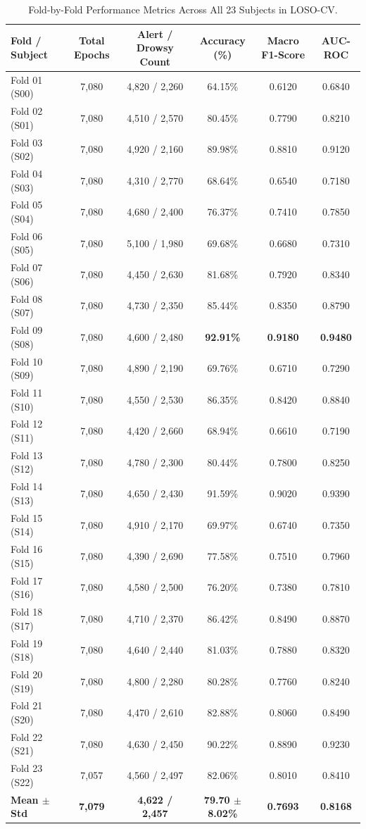 \documentclass[conference]{IEEEtran}
\begin{document}
\begin{table}[t]
\caption{Fold-by-Fold Performance Metrics Across All 23 Subjects in LOSO-CV.}
\label{tab:subject_breakdown}
\centering
\footnotesize
\setlength{\tabcolsep}{7pt}
\begin{tabular}{@{}lccccc@{}}
\toprule
\textbf{Fold / Subject} & \textbf{Total Epochs} & \textbf{Alert / Drowsy Count} & \textbf{Accuracy (\%)} & \textbf{Macro F1-Score} & \textbf{AUC-ROC} \\
\midrule
Fold 01 (S00) & 7,080 & 4,820 / 2,260 & 64.15\% & 0.6120 & 0.6840 \\
Fold 02 (S01) & 7,080 & 4,510 / 2,570 & 80.45\% & 0.7790 & 0.8210 \\
Fold 03 (S02) & 7,080 & 4,920 / 2,160 & 89.98\% & 0.8810 & 0.9120 \\
Fold 04 (S03) & 7,080 & 4,310 / 2,770 & 68.64\% & 0.6540 & 0.7180 \\
Fold 05 (S04) & 7,080 & 4,680 / 2,400 & 76.37\% & 0.7410 & 0.7850 \\
Fold 06 (S05) & 7,080 & 5,100 / 1,980 & 69.68\% & 0.6680 & 0.7310 \\
Fold 07 (S06) & 7,080 & 4,450 / 2,630 & 81.68\% & 0.7920 & 0.8340 \\
Fold 08 (S07) & 7,080 & 4,730 / 2,350 & 85.44\% & 0.8350 & 0.8790 \\
Fold 09 (S08) & 7,080 & 4,600 / 2,480 & \textbf{92.91\%} & \textbf{0.9180} & \textbf{0.9480} \\
Fold 10 (S09) & 7,080 & 4,890 / 2,190 & 69.76\% & 0.6710 & 0.7290 \\
Fold 11 (S10) & 7,080 & 4,550 / 2,530 & 86.35\% & 0.8420 & 0.8840 \\
Fold 12 (S11) & 7,080 & 4,420 / 2,660 & 68.94\% & 0.6610 & 0.7190 \\
Fold 13 (S12) & 7,080 & 4,780 / 2,300 & 80.44\% & 0.7800 & 0.8250 \\
Fold 14 (S13) & 7,080 & 4,650 / 2,430 & 91.59\% & 0.9020 & 0.9390 \\
Fold 15 (S14) & 7,080 & 4,910 / 2,170 & 69.97\% & 0.6740 & 0.7350 \\
Fold 16 (S15) & 7,080 & 4,390 / 2,690 & 77.58\% & 0.7510 & 0.7960 \\
Fold 17 (S16) & 7,080 & 4,580 / 2,500 & 76.20\% & 0.7380 & 0.7810 \\
Fold 18 (S17) & 7,080 & 4,710 / 2,370 & 86.42\% & 0.8490 & 0.8870 \\
Fold 19 (S18) & 7,080 & 4,640 / 2,440 & 81.03\% & 0.7880 & 0.8320 \\
Fold 20 (S19) & 7,080 & 4,800 / 2,280 & 80.28\% & 0.7760 & 0.8240 \\
Fold 21 (S20) & 7,080 & 4,470 / 2,610 & 82.88\% & 0.8060 & 0.8490 \\
Fold 22 (S21) & 7,080 & 4,630 / 2,450 & 90.22\% & 0.8890 & 0.9230 \\
Fold 23 (S22) & 7,057 & 4,560 / 2,497 & 82.06\% & 0.8010 & 0.8410 \\
\midrule
\textbf{Mean $\pm$ Std} & \textbf{7,079} & \textbf{4,622 / 2,457} & \textbf{79.70 $\pm$ 8.02\%} & \textbf{0.7693} & \textbf{0.8168} \\
\bottomrule
\end{tabular}
\end{table}
\end{document}
